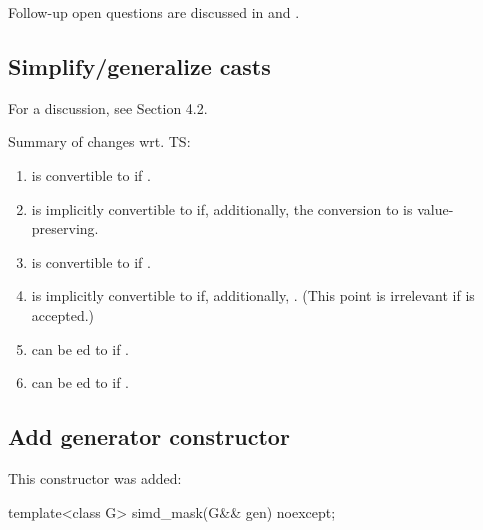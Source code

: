 Follow-up open questions are discussed in  and .

\subsection{Simplify/generalize casts}\label{sec:casts}

For a discussion, see  Section 4.2.

Summary of changes wrt. TS:
\begin{enumerate}
  \item {} is convertible to  if
    .

  \item {} is implicitly convertible to 
    if, additionally, the conversion  to  is
    value-preserving.

  \item {} is convertible to  if
    .

  \item {} is implicitly convertible to
     if, additionally, .
    (This point is irrelevant if  is accepted.)

  \item {} can be ed to  if
    .

  \item {} can be ed to  if
    .
\end{enumerate}

\subsection{Add  generator constructor}

This constructor was added:
\begin{wgText}
\begin{itemdecl}
template<class G> simd_mask(G&& gen) noexcept;
\end{itemdecl}
\end{wgText}

